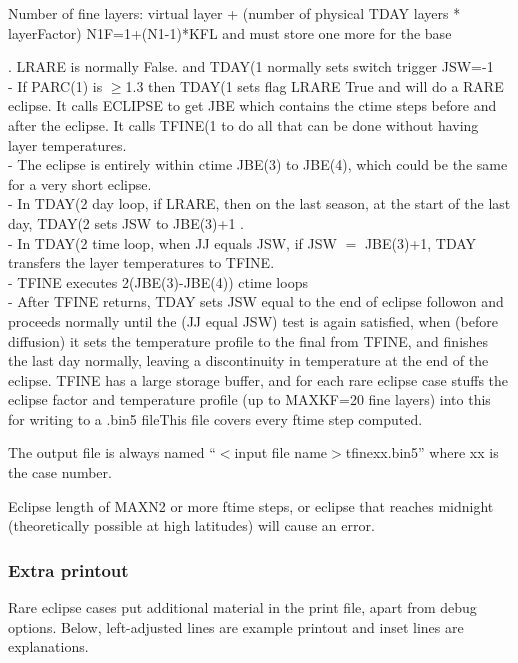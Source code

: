 \documentclass{article}
\begin{document}
Number of fine layers: virtual layer + (number of physical TDAY layers * layerFactor)
\qi  N1F=1+(N1-1)*KFL   and must store one more for the base

. LRARE is normally False. and TDAY(1 normally sets switch trigger JSW=-1
\\ - If PARC(1) is $\geq$1.3 then TDAY(1 sets flag LRARE True and will do a RARE
eclipse. It calls ECLIPSE to get JBE which contains the ctime steps before
and after the eclipse. It calls TFINE(1 to do all that can be done without
having layer temperatures.
\\- The eclipse is entirely within ctime JBE(3) to JBE(4), which could be the same for a very short eclipse.
\\ - In TDAY(2 day loop, if LRARE, then on the last season, at the start of the
last day, TDAY(2 sets JSW to JBE(3)+1 .
\\ - In TDAY(2 time loop, when JJ equals JSW, if JSW $=$  JBE(3)+1, TDAY transfers
the layer temperatures to TFINE.
\\ - TFINE executes 2(JBE(3)-JBE(4)) ctime loops
\\- After TFINE returns, TDAY sets JSW equal to the end of eclipse followon
and proceeds normally until the (JJ equal JSW) test is again satisfied, when
(before diffusion) it sets the temperature profile to the final from TFINE, and
finishes the last day normally, leaving a discontinuity in temperature at the
end of the eclipse.
TFINE has a large storage buffer, and for each rare eclipse case stuffs the
eclipse factor and temperature profile (up to MAXKF=20 fine layers) into this
for writing to a .bin5 fileThis file covers every ftime step computed.

The output file is always named ``$<$input file name$>$tfinexx.bin5'' where xx is the
case number.

Eclipse length of MAXN2 or more ftime steps, or eclipse that reaches midnight
(theoretically possible at high latitudes) will cause an error.

\subsubsection{Extra printout}

Rare eclipse cases put additional material in the print file, apart from debug
options. Below, left-adjusted lines are example printout and inset lines are
explanations.
\end{document}
